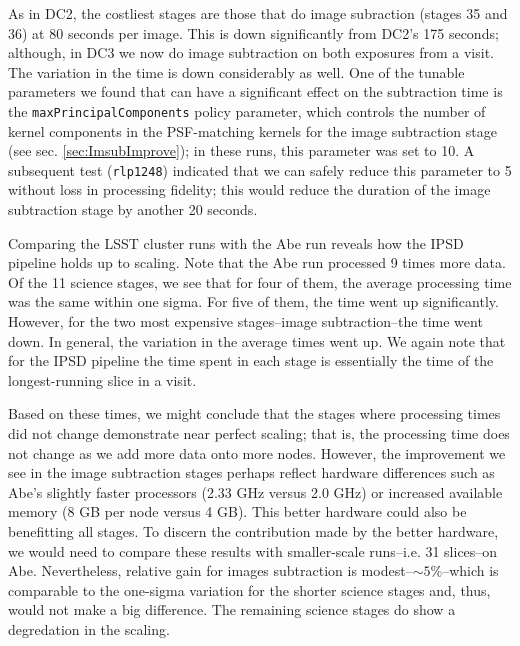 As in DC2, the costliest stages are those that do image subraction
(stages 35 and 36) at 80 seconds per image.  This is down
significantly from DC2's 175 seconds; although, in DC3 we now do image
subtraction on both exposures from a visit.  The variation in the time
is down considerably as well.  One of the tunable parameters we found
that can have a significant effect on the subtraction time is the 
{\tt maxPrincipalComponents} policy parameter, which controls the
number of kernel components in the PSF-matching kernels for the image 
subtraction stage (see sec. \ref{sec:ImsubImprove}); in these runs,
this parameter was set to 10.  A subsequent test ({\tt rlp1248})
indicated that we can safely reduce this parameter to 5 without loss
in processing fidelity; this would reduce the duration of the image
subtraction stage by another 20 seconds.

Comparing the LSST cluster runs with the Abe run reveals how the IPSD 
pipeline holds up to scaling.  Note that the Abe run processed 9 times
more data.  Of the 11 science stages, we see that for four of them,
the average processing time was the same within one sigma.  For five
of them, the time went up significantly.  However, for the two most
expensive stages--image subtraction--the time went down.  In general,
the variation in the average times went up.  We again note that for
the IPSD pipeline the time spent in each stage is essentially the time
of the longest-running slice in a visit.  

Based on these times, we might conclude that the stages where
processing times did not change demonstrate near perfect scaling; that
is, the processing time does not change as we add more data onto more
nodes.  However, the improvement we see in the image subtraction
stages perhaps reflect hardware differences such as Abe's slightly
faster processors (2.33 GHz versus 2.0 GHz) or increased available
memory (8 GB per node versus 4 GB).  This better hardware could also
be benefitting all stages.  To discern the contribution made by the
better hardware, we would need to compare these results with
smaller-scale runs--i.e. 31 slices--on Abe.  Nevertheless, relative
gain for images subtraction is modest--$\sim 5\%$--which is comparable
to the one-sigma variation for the shorter science stages and, thus,
would not make a big difference.  The remaining science stages do show
a degredation in the scaling.  

